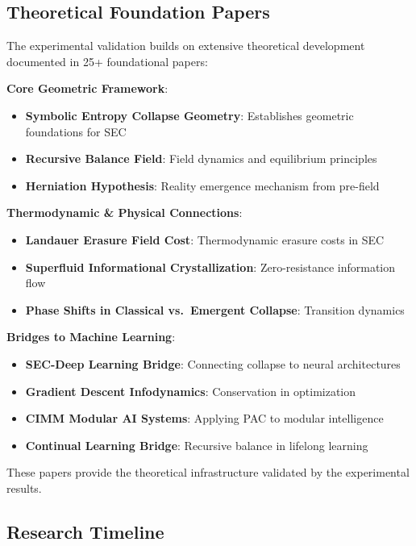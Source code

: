 \documentclass[11pt,a4paper]{article}
\begin{document}
\subsection{Theoretical Foundation Papers}

The experimental validation builds on extensive theoretical development documented in 25+ foundational papers:

\textbf{Core Geometric Framework}:
\begin{itemize}
    \item \textbf{Symbolic Entropy Collapse Geometry}: Establishes geometric foundations for SEC
    \item \textbf{Recursive Balance Field}: Field dynamics and equilibrium principles
    \item \textbf{Herniation Hypothesis}: Reality emergence mechanism from pre-field
\end{itemize}

\textbf{Thermodynamic \& Physical Connections}:
\begin{itemize}
    \item \textbf{Landauer Erasure Field Cost}: Thermodynamic erasure costs in SEC
    \item \textbf{Superfluid Informational Crystallization}: Zero-resistance information flow
    \item \textbf{Phase Shifts in Classical vs.\ Emergent Collapse}: Transition dynamics
\end{itemize}

\textbf{Bridges to Machine Learning}:
\begin{itemize}
    \item \textbf{SEC-Deep Learning Bridge}: Connecting collapse to neural architectures
    \item \textbf{Gradient Descent Infodynamics}: Conservation in optimization
    \item \textbf{CIMM Modular AI Systems}: Applying PAC to modular intelligence
    \item \textbf{Continual Learning Bridge}: Recursive balance in lifelong learning
\end{itemize}

These papers provide the theoretical infrastructure validated by the experimental results.

\subsection{Research Timeline}
\end{document}
